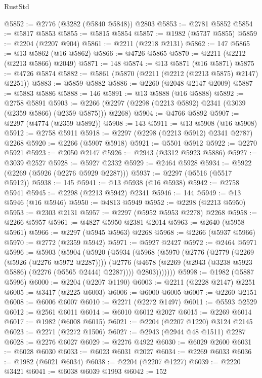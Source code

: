 \begin{lexlean}{RustStd}
\begin{coremodule}
@5852 := @2776 (@3282 (@5840 @5848)) @2803
@5853 := @2781 @5852
@5854 := @5817 @5853
@5855 := @5815 @5854
@5857 := @1982 (@5737 @5855)
@5859 := @2204 (@2207 @904)
@5861 := @2211 (@2218 @2131)
@5862 := 147
@5865 := @13 @5862 (@16 @5862)
@5866 := @4726 @5865
@5870 := @2211 (@2212 (@2213 @5866) @2049)
@5871 := 148
@5874 := @13 @5871 (@16 @5871)
@5875 := @4726 @5874
@5882 := @5861 (@5870 (@2211 (@2212 (@2213 @5875) @2147) @2251))
@5883 := @5859 @5882
@5886 := @2260 (@2048 @2147 @2009)
@5887 := @5883 @5886
@5888 := 146
@5891 := @13 @5888 (@16 @5888)
@5892 := @2758 @5891
@5903 := @2266 (@2297 (@2298 (@2213 @5892) @2341 (@3039 (@2359 @5866) (@2359 @5875))) @2268)
@5904 := @4766 @5892
@5907 := @2297 (@4774 (@2359 @5892))
@5908 := 143
@5911 := @13 @5908 (@16 @5908)
@5912 := @2758 @5911
@5918 := @2297 (@2298 (@2213 @5912) @2341 @2787) @2268
@5920 := @2266 (@5907 @5918)
@5921 := @5501 @5912
@5922 := @2270 @5921
@5923 := @2050 @2147
@5926 := @2943 (@3312 @5923 @5886)
@5927 := @3039 @2527
@5928 := @5927 @2332
@5929 := @2464 @5928
@5934 := @5922 (@2269 (@5926 (@2276 @5929 @2287)))
@5937 := @2297 (@5516 (@5517 @5912))
@5938 := 145
@5941 := @13 @5938 (@16 @5938)
@5942 := @2758 @5941
@5945 := @2298 (@2213 @5942) @2341
@5946 := 144
@5949 := @13 @5946 (@16 @5946)
@5950 := @4813 @5949
@5952 := @2298 (@2213 @5950)
@5953 := @2303 @2131
@5957 := @2297 (@5952 @5953 @2278) @2268
@5958 := @2266 @5957
@5961 := @4827 @5950 @2381 @2014
@5963 := @2640 (@5958 @5961)
@5966 := @2297 (@5945 @5963) @2268
@5968 := @2266 (@5937 @5966)
@5970 := @2772 (@2359 @5942)
@5971 := @5927 @2427
@5972 := @2464 @5971
@5996 := @5903
    (@5904
      (@5920
        (@5934
          (@5968
            (@5970
              (@2776
                (@2779 (@2269 (@5926 (@2276 @5972 @2287))))
                (@2776
                  (@4678 (@2269 (@2943 (@3238 @5923 @5886) (@2276 (@5565 @2444) @2287))))
                  @2803)))))))
@5998 := @1982 (@5887 @5996)
@6000 := @2204 (@2207 @1190)
@6003 := @2211 (@2228 @2147) @2251
@6005 := @3417 (@2225 @6003)
@6006 := @6000 @6005
@6007 := @2260 @2151
@6008 := @6006 @6007
@6010 := @2271 (@2272 @1497)
@6011 := @5593 @2529
@6012 := @2561 @6011
@6014 := @6010 @6012 @2027
@6015 := @2269 @6014
@6017 := @1982 (@6008 @6015)
@6021 := @2204 (@2207 @1220) @3124 @2145
@6023 := @2271 (@2272 @1506)
@6027 := @2943 (@2944 @48 @1511) @2287
@6028 := @2276 @6027
@6029 := @2276 @4922
@6030 := @6029 @2600
@6031 := @6028 @6030
@6033 := @6023 @6031 @2027
@6034 := @2269 @6033
@6036 := @1982 (@6021 @6034)
@6038 := @2204 (@2207 @1227)
@6039 := @2220 @3421
@6041 := @6038 @6039 @1993
@6042 := 152

\end{coremodule}
\end{lexlean}
